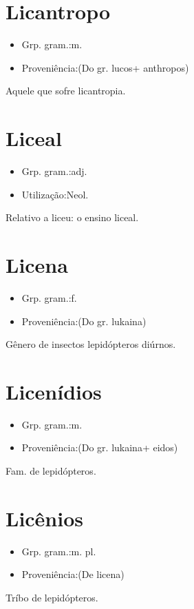\section{Licantropo}
\begin{itemize}
\item {Grp. gram.:m.}
\end{itemize}
\begin{itemize}
\item {Proveniência:(Do gr. \textunderscore lucos\textunderscore  + \textunderscore anthropos\textunderscore )}
\end{itemize}
Aquele que sofre licantropia.
\section{Liceal}
\begin{itemize}
\item {Grp. gram.:adj.}
\end{itemize}
\begin{itemize}
\item {Utilização:Neol.}
\end{itemize}
Relativo a liceu: \textunderscore o ensino liceal\textunderscore .
\section{Licena}
\begin{itemize}
\item {Grp. gram.:f.}
\end{itemize}
\begin{itemize}
\item {Proveniência:(Do gr. \textunderscore lukaina\textunderscore )}
\end{itemize}
Gênero de insectos lepidópteros diúrnos.
\section{Licenídios}
\begin{itemize}
\item {Grp. gram.:m.}
\end{itemize}
\begin{itemize}
\item {Proveniência:(Do gr. \textunderscore lukaina\textunderscore  + \textunderscore eidos\textunderscore )}
\end{itemize}
Fam. de lepidópteros.
\section{Licênios}
\begin{itemize}
\item {Grp. gram.:m. pl.}
\end{itemize}
\begin{itemize}
\item {Proveniência:(De \textunderscore licena\textunderscore )}
\end{itemize}
Tríbo de lepidópteros.
